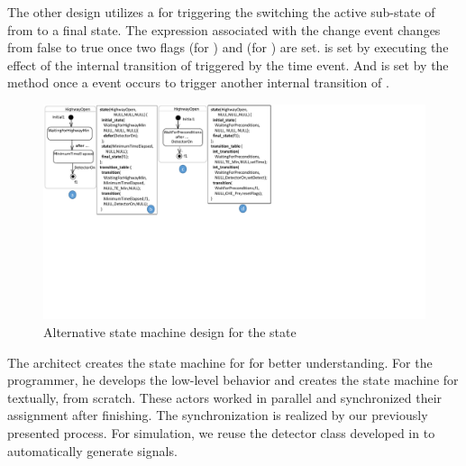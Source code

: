 The other design utilizes a  for triggering the switching the active sub-state of  from  to a final state. 
The expression associated with the change event changes from false to true once two flags  (for ) and  (for ) are set. 
 is set by executing the effect  of the internal transition of  triggered by the  time event. 
And  is set by the method  once a  event occurs to trigger another internal transition of .
\begin{figure}
	\centering
	\includegraphics[clip, trim=0.0cm 9.3cm 13.7cm 0cm, width=\columnwidth]{figures/highwayopenalternatives}
	\caption{Alternative state machine design for the  state} 
	\label{fig:highwayopenalternatives}
\end{figure}

The architect creates the state machine for  
for better understanding.
For the programmer, he 
develops the low-level behavior and creates the state machine for  textually, from scratch.
These actors worked in parallel and synchronized their assignment after finishing.
The synchronization is realized by our previously presented process.
For simulation, we reuse the detector class developed in \cite{farmroadexample} to automatically generate  signals. 




